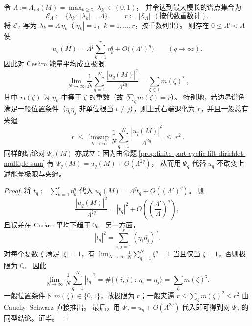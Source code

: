 \begin{theorem}\label{thm:finite-part-boundary-multiplicity-qaxis-energy}
令
\(
\Lambda:=\Lambda_{\mathrm{rel}}(M)=\max_{k\ge2}|\lambda_k|\in(0,1)
\)，
并令达到最大模长的谱点集合为
\[
\mathcal{E}_\Lambda:=\{\lambda_k:\ |\lambda_k|=\Lambda\},
\qquad
r:=|\mathcal{E}_\Lambda|\ \ (\text{按代数重数计}).
\]
将 \(\mathcal{E}_\Lambda\) 写为 \(\lambda_k=\Lambda\,\eta_k\)（\(|\eta_k|=1\)，\(k=1,\dots,r\)，按重数列出）。
则存在 \(0\le \Lambda'<\Lambda\) 使
\[
u_q(M)=\Lambda^{q}\sum_{k=1}^{r}\eta_k^{q}+O\!\bigl((\Lambda')^{q}\bigr)\qquad(q\to\infty).
\]
因此对 Ces\`aro 能量平均成立极限
\[
\boxed{\;
\lim_{N\to\infty}\frac{1}{N}\sum_{q=1}^{N}\frac{|u_q(M)|^2}{\Lambda^{2q}}
=\sum_{\zeta\in\mathbb{T}} m(\zeta)^2\; },
\]
其中 \(m(\zeta)\) 为 \(\eta_k\) 中等于 \(\zeta\) 的重数（故 \(\sum_\zeta m(\zeta)=r\)）。
特别地，若边界谱角满足一般位置条件（\(\eta_i\overline{\eta_j}\) 非单位根当 \(i\neq j\)），则上式右端退化为 \(r\)，并且一般总有夹逼
\[
\boxed{\;
r\ \le\ \limsup_{N\to\infty}\frac{1}{N}\sum_{q=1}^{N}\frac{|u_q(M)|^2}{\Lambda^{2q}}\ \le\ r^2\; }.
\]
同样的结论对 \(\Psi_q(M)\) 亦成立：因为由命题 \ref{prop:finite-part-cyclic-lift-dirichlet-multiple-sum} 有
\(
\Psi_q(M)=u_q(M)+O(\Lambda^{2q})
\)，
从而用 \(\Psi_q\) 代替 \(u_q\) 不改变上述能量极限与夹逼。
\end{theorem}
\begin{proof}
将
\(
t_q:=\sum_{k=1}^{r}\eta_k^{q}
\)
代入 \(u_q(M)=\Lambda^{q}t_q+O((\Lambda')^{q})\)。
则
\[
\frac{|u_q(M)|^2}{\Lambda^{2q}}
=|t_q|^2+O\!\left(\left(\frac{\Lambda'}{\Lambda}\right)^{q}\right),
\]
且误差在 Ces\`aro 平均下趋于 \(0\)。
另一方面，
\[
|t_q|^2=\sum_{i,j=1}^{r}(\eta_i\overline{\eta_j})^{q}.
\]
对每个复数 \(\xi\) 满足 \(|\xi|=1\)，有
\(
\lim_{N\to\infty}\frac{1}{N}\sum_{q=1}^{N}\xi^{q}=1
\)
当且仅当 \(\xi=1\)，否则极限为 \(0\)。
因此
\[
\lim_{N\to\infty}\frac{1}{N}\sum_{q=1}^{N}|t_q|^2
=\#\{(i,j):\ \eta_i=\eta_j\}
=\sum_{\zeta} m(\zeta)^2.
\]
一般位置条件下 \(m(\zeta)\in\{0,1\}\)，故极限为 \(r\)；一般夹逼 \(r\le \sum_\zeta m(\zeta)^2\le r^2\) 由 Cauchy--Schwarz 直接推出。
最后，用 \(\Psi_q=u_q+O(\Lambda^{2q})\) 代入即可得到对 \(\Psi_q\) 的同型结论。证毕。
\end{proof}


